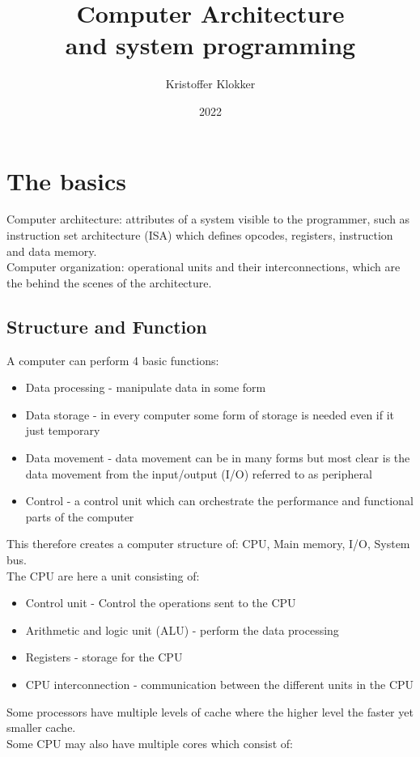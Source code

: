 \documentclass[12pt, a4paper]{article}
\title{Computer Architecture\\and system programming}
\date{2022}
\author{Kristoffer Klokker}
\begin{document}
	\maketitle
	\clearpage
	\tableofcontents
	\clearpage
	\section{The basics}
		Computer architecture: attributes of a system visible to the programmer, such as instruction set architecture (ISA) which defines opcodes, registers, instruction and data memory.\\
		Computer organization: operational units and their interconnections, which are the behind the scenes of the architecture.\\
		\subsection{Structure and Function}
			A computer can perform 4 basic functions:
			\begin{itemize}
				\item Data processing - manipulate data in some form
				\item Data storage - in every computer some form of storage is needed even if it just temporary
				\item Data movement - data movement can be in many forms but most clear is the data movement from the input/output (I/O) referred to as peripheral
				\item Control - a control unit which can orchestrate the performance and functional parts of the computer
			\end{itemize}
			 This therefore creates a computer structure of:  CPU, Main memory, I/O, System bus.\\
			 The CPU are here a unit consisting of:
			 \begin{itemize}
			 	\item Control unit - Control the operations sent to the CPU
			 	\item Arithmetic and logic unit (ALU) - perform the data processing
			 	\item Registers - storage for the CPU
			 	\item CPU interconnection - communication between the different units in the CPU
			\end{itemize}
			Some processors have multiple levels of cache where the higher level the faster yet smaller cache.\\
			Some CPU may also have multiple cores which consist of: 
\end{document}
